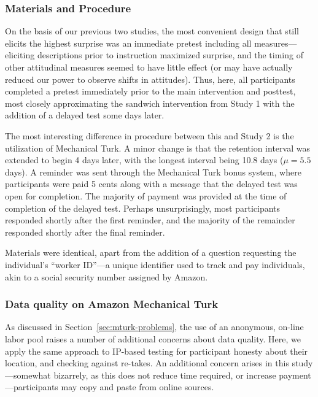 
\subsubsection{Materials and Procedure}

On the basis of our previous two studies, the most convenient design that still
elicits the highest surprise was an immediate pretest including all
measures---eliciting descriptions prior to instruction maximized surprise, and
the timing of other attitudinal measures seemed to have little effect (or may
have actually reduced our power to observe shifts in attitudes). Thus, here, all
participants completed a pretest immediately prior to the main intervention and
posttest, most closely approximating the sandwich intervention from Study 1
with the addition of a delayed test some days later.

The most interesting difference in procedure between this and Study 2 is the
utilization of Mechanical Turk. A minor change is that the retention interval
was extended to begin 4 days later, with the longest interval being 10.8 days
($\mu=5.5$ days). A reminder was sent through the Mechanical Turk bonus system,
where participants were paid 5 cents along with a message that the delayed test
was open for completion. The majority of payment was provided at the time of
completion of the delayed test. Perhaps unsurprisingly, most participants
responded shortly after the first reminder, and the majority of the remainder
responded shortly after the final reminder.

Materials were identical, apart from the addition of a question requesting the
individual's “worker ID”---a unique identifier used to track and pay
individuals, akin to a social security number assigned by Amazon.

\subsubsection{Data quality on Amazon Mechanical Turk}

As discussed in Section~\ref{sec:mturk-problems}, the use of an anonymous,
on-line labor pool raises a number of additional concerns about data quality.
Here, we apply the same approach to IP-based testing for participant honesty
about their location, and checking against re-takes.  An additional concern
arises in this study---somewhat bizarrely, as this does not reduce time
required, or increase payment---participants may copy and paste from online
sources.

